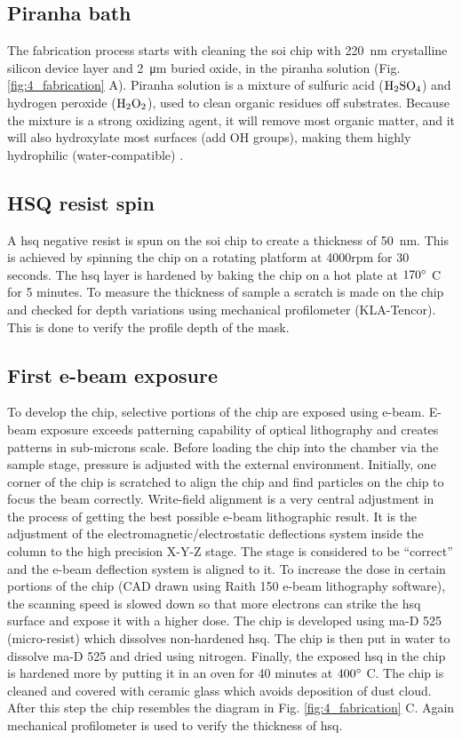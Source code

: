 \documentclass[../report.tex]{subfiles}
\begin{document}
\subsection{Piranha bath}			
The fabrication process starts with cleaning the \gls{soi} chip with \SI{220}{\nano \meter} crystalline silicon device layer and \SI{2}{\micro \meter} buried oxide, in the piranha solution (Fig. \ref{fig:4_fabrication} A). Piranha solution is a mixture of sulfuric acid ($\mathrm{H_2SO_4}$) and hydrogen peroxide ($\mathrm{H_2O_2}$), used to clean organic residues off substrates. Because the mixture is a strong oxidizing agent, it will remove most organic matter, and it will also hydroxylate most surfaces (add OH groups), making them highly hydrophilic (water-compatible) \cite{piranha_bath}. 
 
\subsection{HSQ resist spin}
A \gls{hsq} negative resist is spun on the \gls{soi} chip to create a thickness of \SI{50}{\nano \meter}. This is achieved by spinning the chip on a  rotating platform at 4000rpm for 30 seconds. The \gls{hsq} layer is hardened by baking the chip on a hot plate at $\mathrm{170^{\circ}}$ C for 5 minutes. To measure the thickness of sample a scratch is made on the chip and checked for depth variations using mechanical profilometer (KLA-Tencor). This is done to verify the profile depth of the mask.

\subsection{First e-beam exposure}
To develop the chip, selective portions of the chip are exposed using e-beam. E-beam exposure exceeds patterning capability of optical lithography and creates patterns in sub-microns scale. Before loading the chip into the chamber via the sample stage, pressure is adjusted with the external environment. Initially, one corner of the chip is scratched to align the chip and find particles on the chip to focus the beam correctly. Write-field alignment is a very central adjustment in the process of getting the best possible e-beam lithographic result. It is the adjustment of the electromagnetic/electrostatic deflections system inside the column to the high precision X-Y-Z stage. The stage is considered to be ``correct'' and the e-beam deflection system is aligned to it. To increase the dose in certain portions of the chip (CAD drawn using Raith 150 e-beam lithography software), the scanning speed is slowed down so that more electrons can strike the \gls{hsq} surface and expose it with a higher dose. The chip is developed using ma-D 525 (micro-resist) which dissolves non-hardened \gls{hsq}. The chip is then put in water to dissolve ma-D 525 and dried using nitrogen. Finally, the exposed \gls{hsq} in the chip is hardened more by putting it in an oven for 40 minutes at $\mathrm{400^{\circ}}$ C. The chip is cleaned and covered with ceramic glass which avoids deposition of dust cloud. After this step the chip resembles the diagram in Fig. \ref{fig:4_fabrication} C. Again mechanical profilometer is used to verify the thickness of \gls{hsq}.    
\end{document}
